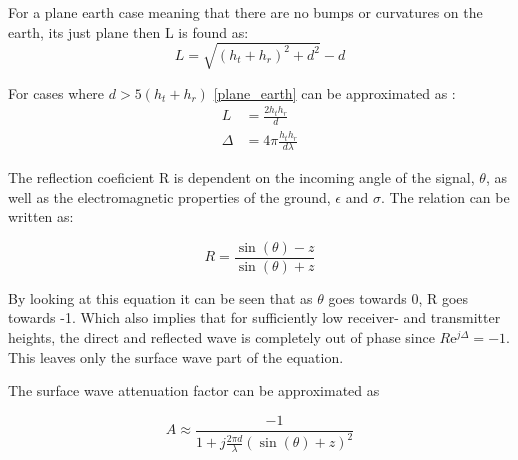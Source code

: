 For a plane earth case meaning that there are no bumps or curvatures on the earth, its just plane then L is found as:
\begin{equation}
L=\sqrt{(h_t+h_r)^2+d^2}-d
\label{plane_earth}
\end{equation}
\begin{where}
\end{where}

For cases where $d > 5(h_t+h_r)$ \autoref{plane_earth} can be approximated as \citep{Bullington}:
\begin{align}
L &=\frac{2h_th_r}{d} \\
\Delta &= 4\pi\frac{h_th_r}{d\lambda}
\end{align}

The reflection coeficient R is dependent on the incoming angle of the signal, $\theta$, as well as the electromagnetic properties of the ground, $\epsilon$ and $\sigma$. The relation can be written as\citep{Bullington}:

\begin{equation}
R=\frac{\sin(\theta)-z}{\sin(\theta)+z}
\end{equation}
\begin{where}
\end{where}

By looking at this equation it can be seen that as $\theta$ goes towards 0, R goes towards -1. Which also implies that for sufficiently low receiver- and transmitter heights, the direct and reflected wave is completely out of phase since $R\text{e}^{j\Delta} = -1$. This leaves only the surface wave part of the equation.

The surface wave attenuation factor can be approximated as\citep{Bullington}

\begin{equation}
A\approx\frac{-1}{1+j\frac{2\pi d}{\lambda}\left(\sin(\theta)+z\right)^2}
\end{equation}

